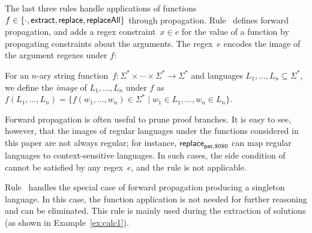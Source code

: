 The last three rules handle applications of functions
$f \in \{\cdot, \mathsf{extract}, \mathsf{replace}, \mathsf{replaceAll}\}$ through
propagation. Rule~ defines forward propagation, and
adds a regex constraint~$x \in e$ for the value of a function by
propagating constraints about the arguments. The regex~$e$ encodes
the image of the argument regexes under $f$:
%
\begin{definition}[Image]
  For an $n$-ary string
  function~$f : \Sigma^* \times \cdots \times \Sigma^* \to \Sigma^*$
  and languages $L_1, \ldots, L_n \subseteq \Sigma^*$, we define the
  \emph{image} of $L_1, \ldots, L_n$ under $f$ as
  $f(L_1, \ldots, L_n) = \{f(w_1, \ldots, w_n) \in \Sigma^* \mid w_1
  \in L_1, \ldots, w_n \in L_n \}$.
\end{definition}

Forward propagation is often useful to prune proof branches. It is
easy to see, however, that the images of regular languages under the
functions considered in this paper are not always regular; for
instance, $\mathsf{replace}_{\mathsf{pat},\$0\$0}$ can map regular languages to
context-sensitive languages. In such cases, the side condition of
 cannot be satisfied by any regex~$e$, and the rule
is not applicable.

Rule~ handles the special case of forward
propagation producing a singleton language. In this case, the function
application is not needed for further reasoning and can be
eliminated. This rule is mainly used during the extraction of
solutions (as shown in Example~\ref{ex:calc1}).

